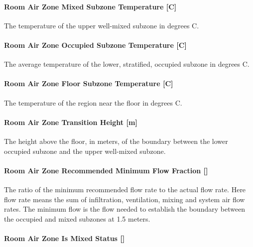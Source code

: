 \paragraph{Room Air Zone Mixed Subzone Temperature {[}C{]}}\label{room-air-zone-mixed-subzone-temperature-c}

The temperature of the upper well-mixed subzone in degrees C.

\paragraph{Room Air Zone Occupied Subzone Temperature {[}C{]}}\label{room-air-zone-occupied-subzone-temperature-c}

The average temperature of the lower, stratified, occupied subzone in degrees C.

\paragraph{Room Air Zone Floor Subzone Temperature {[}C{]}}\label{room-air-zone-floor-subzone-temperature-c}

The temperature of the region near the floor in degrees C.

\paragraph{Room Air Zone Transition Height {[}m{]}}\label{room-air-zone-transition-height-m}

The height above the floor, in meters, of the boundary between the lower occupied subzone and the upper well-mixed subzone.

\paragraph{\texorpdfstring{Room Air Zone Recommended Minimum Flow Fraction {[]}}{Room Air Zone Recommended Minimum Flow Fraction }}\label{room-air-zone-recommended-minimum-flow-fraction}

The ratio of the minimum recommended flow rate to the actual flow rate. Here flow rate means the sum of infiltration, ventilation, mixing and system air flow rates. The minimum flow is the flow needed to establish the boundary between the occupied and mixed subzones at 1.5 meters.

\paragraph{\texorpdfstring{Room Air Zone Is Mixed Status {[]}}{Room Air Zone Is Mixed Status }}\label{room-air-zone-is-mixed-status}

